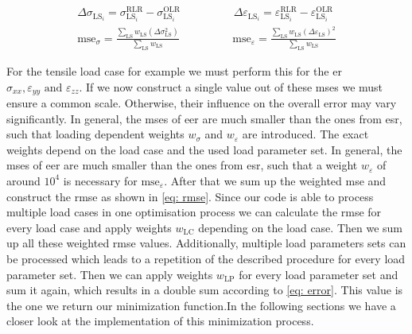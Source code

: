 \begin{gather}
    \label{eq: EMDifference}
    \Delta\sigma_{\scriptscriptstyle\text{LS}_i} = \sigma_{\scriptscriptstyle\text{LS}_i}^{\scriptscriptstyle\text{RLR}} - \sigma_{\scriptscriptstyle\text{LS}_i}^{\scriptscriptstyle\text{OLR}} \hspace{2cm}
    \Delta\varepsilon_{\scriptscriptstyle\text{LS}_i} = \varepsilon_{\scriptscriptstyle\text{LS}_i}^{\scriptscriptstyle\text{RLR}} - \varepsilon_{\scriptscriptstyle\text{LS}_i}^{\scriptscriptstyle\text{OLR}}\\
    \label{eq: mse}
    \text{mse}_{\sigma} = \frac{\displaystyle\sum_{\text{LS}} w_{\scriptscriptstyle\text{LS}} (\Delta\sigma_{\scriptscriptstyle\text{LS}}^2)}{\displaystyle\sum_{\text{LS}}w_{\scriptscriptstyle\text{LS}} } \hspace{2cm}
    \text{mse}_{\varepsilon} = \frac{\displaystyle\sum_{\text{LS}} w_{\scriptscriptstyle\text{LS}} (\Delta\varepsilon_{\scriptscriptstyle\text{LS}})^2}{\displaystyle\sum_{\text{LS}}w_{\scriptscriptstyle\text{LS}}}
\end{gather}



For the tensile load case for example we must perform this for the \acrlong{er} $\sigma_{xx}, \varepsilon_{yy} \text{ and } \varepsilon_{zz}$. 
If we now construct a single value out of these \acrshort{mse}s we must ensure a common scale. Otherwise, their influence on the overall error may vary significantly. In general, the \acrshort{mse}s of \acrlong{eer} are much smaller than the ones from \acrlong{esr}, such that loading dependent weights $w_{\sigma}$ and $w_{\varepsilon}$ are introduced. The exact weights depend on the load case and the used load parameter set. In general, the \acrshort{mse}s of \acrlong{eer} are much smaller than the ones from \acrlong{esr}, such that a weight $w_{\varepsilon}$ of around $10^4$ is necessary for $\text{mse}_{\varepsilon}$. After that we sum up the weighted \acrshort{mse} and construct the \acrshort{rmse} as shown in \autoref{eq: rmse}. Since our code is able to process multiple load cases in one optimisation process we can calculate the \acrshort{rmse} for every load case and apply weights $w_{\scriptscriptstyle\text{LC}}$ depending on the load case. Then we sum up all these weighted \acrshort{rmse} values. Additionally, multiple load parameters sets can be processed which leads to a repetition of the described procedure for every load parameter set. Then we can apply weights $w_{\scriptscriptstyle\text{LP}}$ for every load parameter set and sum it again, which results in a double sum according to \autoref{eq: error}. This value is the one we return our minimization function.In the following sections we have a closer look at the implementation of this minimization process. 

